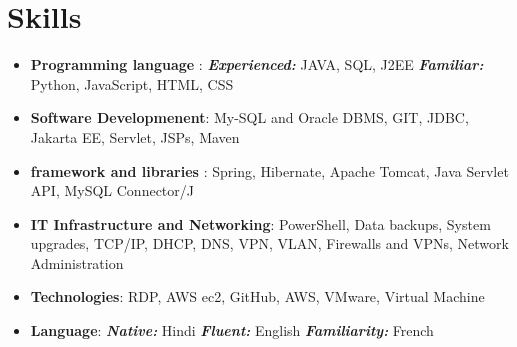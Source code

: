 \documentclass[letterpaper,11pt]{article}
\newcommand{\resumeSubHeadingListStart}{\begin{itemize}[leftmargin=*]}
\newcommand{\resumeSubHeadingListEnd}{\end{itemize}}
\begin{document}
%
\section{Skills}
\resumeSubHeadingListStart
\item{
            \textbf{Programming language }{: \textit{\small \textbf{Experienced:}} JAVA, SQL, J2EE \textit{\small \textbf{Familiar:}} Python, JavaScript, HTML, CSS}
      }
\item {
            \textbf{Software Developmenent}{: My-SQL and Oracle DBMS, GIT, JDBC, Jakarta EE, Servlet, JSPs, Maven }
      }
\item{
            \textbf{framework and libraries }{: Spring, Hibernate, Apache Tomcat, Java Servlet API, MySQL Connector/J}
      }
\item{
            \textbf{IT Infrastructure and Networking}{: PowerShell, Data backups, System upgrades, TCP/IP, DHCP, DNS, VPN, VLAN, Firewalls and VPNs, Network Administration }
      }
\item{
            \textbf{Technologies}{: RDP, AWS ec2, GitHub, AWS, VMware, Virtual Machine}
      }

\item {
            \textbf{Language}{: \textit{\small \textbf{Native:}} Hindi \textit{\small \textbf{Fluent:}} English \textit{\small \textbf{Familiarity:}} French}
      }
\resumeSubHeadingListEnd




\end{document}

